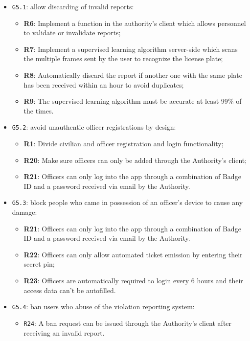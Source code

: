 \documentclass[12pt,a4paper]{article}
\begin{document}
	\begin{itemize}
	\item \texttt{G5.1}: allow discarding of invalid reports:
							\begin{itemize}
									\item \textbf{R6}: Implement a function in the authority's client which allows personnel to validate or invalidate reports;
									\item \textbf{R7}: Implement a supervised learning algorithm server-side which scans the multiple frames sent by the user to recognize the license plate;
									\item \textbf{R8}: Automatically discard the report if another one with the same plate has been received within an hour to avoid duplicates;
									\item \textbf{R9}: The supervised learning algorithm must be accurate at least 99\% of the times.
							\end{itemize}
	\item \texttt{G5.2}: avoid unauthentic officer registrations by design:
							\begin{itemize}
									\item \textbf{R1}: Divide civilian and officer registration and login functionality;
									\item \textbf{R20}: Make sure officers can only be added through the Authority's client;
									\item \textbf{R21}: Officers can only log into the app through a combination of Badge ID and a password received via email by the Authority.
							\end{itemize}
	\item \texttt{G5.3}: block people who came in possession of an officer's device to cause any damage:
							\begin{itemize}
									\item \textbf{R21}: Officers can only log into the app through a combination of Badge ID and a password received via email by the Authority.
									\item \textbf{R22}: Officers can only allow automated ticket emission by entering their secret pin;
									\item \textbf{R23}: Officers are automatically required to login every 6 hours and their access data can't be autofilled.
							\end{itemize}
	\item \texttt{G5.4}: ban users who abuse of the violation reporting system:
							\begin{itemize}
									\item \texttt{R24}: A ban request can be issued through the Authority's client after receiving an invalid report.
							\end{itemize}
	\end{itemize}
	
\end{document}

